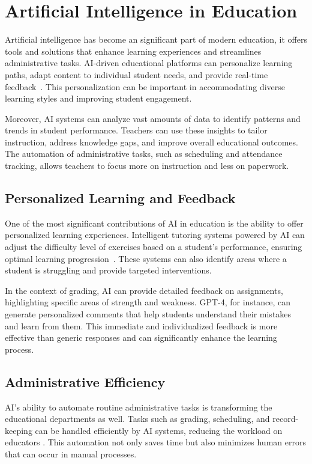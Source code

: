 \documentclass[ms,twoside,print]{nuthesis}
\begin{document}
\section{Artificial Intelligence in Education}

Artificial intelligence has become an significant part of modern education, it offers tools and solutions that enhance learning experiences and streamlines administrative tasks. AI-driven educational platforms can personalize learning paths, adapt content to individual student needs, and provide real-time feedback~\cite{Alto2023}. This personalization can be important in accommodating diverse learning styles and improving student engagement.

Moreover, AI systems can analyze vast amounts of data to identify patterns and trends in student performance. Teachers can use these insights to tailor instruction, address knowledge gaps, and improve overall educational outcomes. The automation of administrative tasks, such as scheduling and attendance tracking, allows teachers to focus more on instruction and less on paperwork.~\cite{CitationNeeded}

\subsection{Personalized Learning and Feedback}

One of the most significant contributions of AI in education is the ability to offer personalized learning experiences. Intelligent tutoring systems powered by AI can adjust the difficulty level of exercises based on a student's performance, ensuring optimal learning progression~\cite{Alto2023}. These systems can also identify areas where a student is struggling and provide targeted interventions.

In the context of grading, AI can provide detailed feedback on assignments, highlighting specific areas of strength and weakness. GPT-4, for instance, can generate personalized comments that help students understand their mistakes and learn from them. This immediate and individualized feedback is more effective than generic responses and can significantly enhance the learning process.

\subsection{Administrative Efficiency}

AI's ability to automate routine administrative tasks is transforming the educational departments as well. Tasks such as grading, scheduling, and record-keeping can be handled efficiently by AI systems, reducing the workload on educators \cite{Alto2023}. This automation not only saves time but also minimizes human errors that can occur in manual processes.
\end{document}
